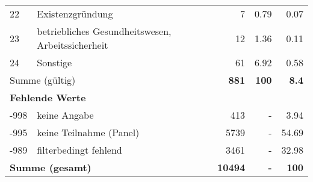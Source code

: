 \begin{longtable}{lXrrr}
        22 & \multicolumn{1}{X}{Existenzgründung} & %
          \num{7} &
          \num[round-mode=places,round-precision=2]{0,79} &
          \num[round-mode=places,round-precision=2]{0,07} \\

        23 & \multicolumn{1}{X}{betriebliches Gesundheitswesen, Arbeitssicherheit} & %
          \num{12} &
          \num[round-mode=places,round-precision=2]{1,36} &
          \num[round-mode=places,round-precision=2]{0,11} \\

        24 & \multicolumn{1}{X}{Sonstige} & %
          \num{61} &
          \num[round-mode=places,round-precision=2]{6,92} &
          \num[round-mode=places,round-precision=2]{0,58} \\

     \midrule
     \multicolumn{2}{l}{Summe (gültig)} &
       \textbf{\num{881}} &
     \textbf{100} &
       \textbf{\num[round-mode=places,round-precision=2]{8,4}} \\
     \multicolumn{5}{l}{\textbf{Fehlende Werte}}\\
       -998 &
       keine Angabe &
         \num{413} &
        - &
         \num[round-mode=places,round-precision=2]{3,94} \\
       -995 &
       keine Teilnahme (Panel) &
         \num{5739} &
        - &
         \num[round-mode=places,round-precision=2]{54,69} \\
       -989 &
       filterbedingt fehlend &
         \num{3461} &
        - &
         \num[round-mode=places,round-precision=2]{32,98} \\
     \midrule
     \multicolumn{2}{l}{\textbf{Summe (gesamt)}} &
          \textbf{\num{10494}} &
        \textbf{-} &
        \textbf{100} \\
     \bottomrule
     \end{longtable}
     
